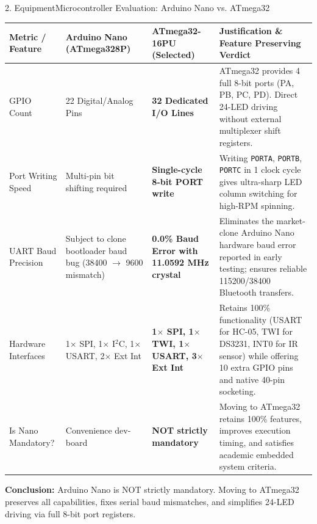 \documentclass[aspectratio=169, 10pt]{beamer}
\begin{document}
\begin{frame}{2. Equipment}{Microcontroller Evaluation: Arduino Nano vs. ATmega32}
    \tiny
    \begin{table}
        \centering
        \begin{tabular}{p{2.2cm} p{2.3cm} p{2.5cm} p{3.9cm}}
            \toprule
            \textbf{\color{Accent} Metric / Feature} & \textbf{\color{Accent} Arduino Nano (ATmega328P)} & \textbf{\color{Accent} ATmega32-16PU (Selected)} & \textbf{\color{Accent} Justification \& Feature Preserving Verdict} \\
            \midrule
            GPIO Count & 22 Digital/Analog Pins & \textbf{32 Dedicated I/O Lines} & ATmega32 provides 4 full 8-bit ports (PA, PB, PC, PD). Direct 24-LED driving without external multiplexer shift registers. \\
            Port Writing Speed & Multi-pin bit shifting required & \textbf{Single-cycle 8-bit PORT write} & Writing \texttt{PORTA}, \texttt{PORTB}, \texttt{PORTC} in 1 clock cycle gives ultra-sharp LED column switching for high-RPM spinning. \\
            UART Baud Precision & Subject to clone bootloader baud bug (38400 $\rightarrow$ 9600 mismatch) & \textbf{0.0\% Baud Error with 11.0592 MHz crystal} & Eliminates the market-clone Arduino Nano hardware baud error reported in early testing; ensures reliable 115200/38400 Bluetooth transfers. \\
            Hardware Interfaces & 1$\times$ SPI, 1$\times$ I$^2$C, 1$\times$ USART, 2$\times$ Ext Int & \textbf{1$\times$ SPI, 1$\times$ TWI, 1$\times$ USART, 3$\times$ Ext Int} & Retains 100\% functionality (USART for HC-05, TWI for DS3231, INT0 for IR sensor) while offering 10 extra GPIO pins and native 40-pin socketing. \\
            Is Nano Mandatory? & Convenience dev-board & \textbf{NOT strictly mandatory} & Moving to ATmega32 retains 100\% features, improves execution timing, and satisfies academic embedded system criteria. \\
            \bottomrule
        \end{tabular}
    \end{table}
    \vspace{0.1cm}
    \footnotesize\color{Dim} \textbf{Conclusion:} Arduino Nano is NOT strictly mandatory. Moving to ATmega32 preserves all capabilities, fixes serial baud mismatches, and simplifies 24-LED driving via full 8-bit port registers.
\end{frame}
\end{document}

